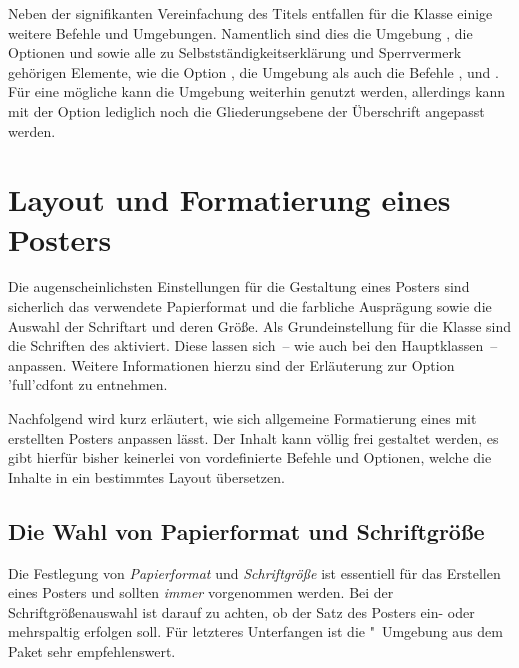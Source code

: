 \begin{DeclareEntity}{}
Neben der signifikanten Vereinfachung des Titels entfallen für die Klasse 
 einige weitere Befehle und Umgebungen. Namentlich sind 
dies die Umgebung , die Optionen  
und  sowie alle zu Selbstständigkeitserklärung und 
Sperrvermerk gehörigen Elemente, wie die Option , die 
Umgebung  als auch die Befehle , 
 und . Für eine mögliche \abstractname{} 
kann die Umgebung  weiterhin genutzt werden, allerdings 
kann mit der Option  lediglich noch die Gliederungsebene der 
Überschrift angepasst werden.



\section{Layout und Formatierung eines Posters}

Die augenscheinlichsten Einstellungen für die Gestaltung eines Posters sind 
sicherlich das verwendete Papierformat und die farbliche Ausprägung sowie die 
Auswahl der Schriftart und deren Größe. Als Grundeinstellung für die Klasse
 sind die Schriften des \TUDCDs aktiviert. Diese lassen 
sich~-- wie auch bei den Hauptklassen~-- anpassen. Weitere Informationen hierzu 
sind der Erläuterung zur Option \Option'full'{cdfont} zu entnehmen.

Nachfolgend wird kurz erläutert, wie sich allgemeine Formatierung eines mit 
 erstellten Posters anpassen lässt. Der Inhalt kann völlig 
frei gestaltet werden, es gibt hierfür bisher keinerlei von \TUDScript 
vordefinierte Befehle und Optionen, welche die Inhalte in ein bestimmtes Layout 
übersetzen.



\subsection{%
  Die Wahl von Papierformat und Schriftgröße%
  \label{sec:fontsize}%
}

Die Festlegung von \emph{Papierformat} und \emph{Schriftgröße} ist essentiell 
für das Erstellen eines Posters und sollten \emph{immer} vorgenommen werden. 
Bei der Schriftgrößenauswahl ist darauf zu achten, ob der Satz des Posters 
ein- oder mehrspaltig erfolgen soll. Für letzteres Unterfangen ist die 
"~Umgebung aus dem Paket 
 sehr empfehlenswert. 


\end{DeclareEntity}

